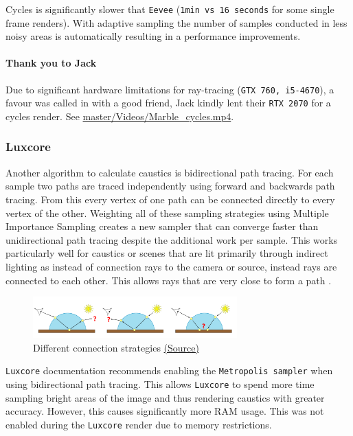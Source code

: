 \documentclass[11pt]{article}
\begin{document}
Cycles is significantly slower that \texttt{Eevee} (\texttt{1min vs 16 seconds} for some single
frame renders). With adaptive sampling the number of samples conducted in less
noisy areas is automatically resulting in a performance improvements.
\paragraph{Thank you to Jack}
\label{sec:org3aea543}
Due to significant hardware limitations for ray-tracing (\texttt{GTX 760, i5-4670}), a
favour was called in with a good friend, Jack kindly lent their \texttt{RTX 2070}  for a
cycles render. See \href{https://github.com/Jake-Moss/blender-chess/blob/master/Videos/Marble\_cycles.mp4}{master/Videos/Marble\_cycles.mp4}.
\subsubsection{Luxcore}
\label{sec:orgba5a8c3}
Another algorithm to calculate caustics is bidirectional path tracing. For each
sample two paths are traced independently using forward and backwards path tracing.
From this every vertex of one path can be connected directly to every vertex of
the other. Weighting all of these sampling strategies using Multiple Importance
Sampling creates a new sampler that can converge faster than unidirectional path
tracing despite the additional work per sample. This works particularly well for
caustics or scenes that are lit primarily through indirect lighting as instead
of connection rays to the camera or source, instead rays are connected to
each other. This allows rays that are very close to form a path \cite{Caustic-Connection}.

\begin{figure}[htbp]
\centering
\includegraphics[width=0.7\textwidth]{Images/bidirectional diagram.png}
\caption{\label{bidirectional}Different connection strategies \href{https://graphics.pixar.com/library/CausticConnections/paper.pdf}{(Source)}}
\end{figure}

\texttt{Luxcore} documentation recommends enabling the \texttt{Metropolis sampler} when using
bidirectional path tracing. This allows \texttt{Luxcore} to spend more time sampling
bright areas of the image and thus rendering caustics with greater accuracy.
However, this causes significantly more RAM usage. This was not enabled during
the \texttt{Luxcore} render due to memory restrictions.
\end{document}
